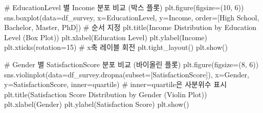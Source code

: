 \documentclass[
  letterpaper,
]{book}
\newenvironment{Shaded}{\begin{snugshade}}{\end{snugshade}}
\newcommand{\CommentTok}[1]{\textcolor[rgb]{0.37,0.37,0.37}{#1}}
\newcommand{\DecValTok}[1]{\textcolor[rgb]{0.68,0.00,0.00}{#1}}
\newcommand{\NormalTok}[1]{\textcolor[rgb]{0.00,0.23,0.31}{#1}}
\newcommand{\OperatorTok}[1]{\textcolor[rgb]{0.37,0.37,0.37}{#1}}
\newcommand{\StringTok}[1]{\textcolor[rgb]{0.13,0.47,0.30}{#1}}
\begin{document}
\begin{Shaded}
\begin{Highlighting}[]
\CommentTok{\# EducationLevel 별 Income 분포 비교 (박스 플롯)}
\NormalTok{plt.figure(figsize}\OperatorTok{=}\NormalTok{(}\DecValTok{10}\NormalTok{, }\DecValTok{6}\NormalTok{))}
\NormalTok{sns.boxplot(data}\OperatorTok{=}\NormalTok{df\_survey, x}\OperatorTok{=}\StringTok{\textquotesingle{}EducationLevel\textquotesingle{}}\NormalTok{, y}\OperatorTok{=}\StringTok{\textquotesingle{}Income\textquotesingle{}}\NormalTok{, order}\OperatorTok{=}\NormalTok{[}\StringTok{\textquotesingle{}High School\textquotesingle{}}\NormalTok{, }\StringTok{\textquotesingle{}Bachelor\textquotesingle{}}\NormalTok{, }\StringTok{\textquotesingle{}Master\textquotesingle{}}\NormalTok{, }\StringTok{\textquotesingle{}PhD\textquotesingle{}}\NormalTok{]) }\CommentTok{\# 순서 지정}
\NormalTok{plt.title(}\StringTok{\textquotesingle{}Income Distribution by Education Level (Box Plot)\textquotesingle{}}\NormalTok{)}
\NormalTok{plt.xlabel(}\StringTok{\textquotesingle{}Education Level\textquotesingle{}}\NormalTok{)}
\NormalTok{plt.ylabel(}\StringTok{\textquotesingle{}Income\textquotesingle{}}\NormalTok{)}
\NormalTok{plt.xticks(rotation}\OperatorTok{=}\DecValTok{15}\NormalTok{) }\CommentTok{\# x축 레이블 회전}
\NormalTok{plt.tight\_layout()}
\NormalTok{plt.show()}

\CommentTok{\# Gender 별 SatisfactionScore 분포 비교 (바이올린 플롯)}
\NormalTok{plt.figure(figsize}\OperatorTok{=}\NormalTok{(}\DecValTok{8}\NormalTok{, }\DecValTok{6}\NormalTok{))}
\NormalTok{sns.violinplot(data}\OperatorTok{=}\NormalTok{df\_survey.dropna(subset}\OperatorTok{=}\NormalTok{[}\StringTok{\textquotesingle{}SatisfactionScore\textquotesingle{}}\NormalTok{]), x}\OperatorTok{=}\StringTok{\textquotesingle{}Gender\textquotesingle{}}\NormalTok{, y}\OperatorTok{=}\StringTok{\textquotesingle{}SatisfactionScore\textquotesingle{}}\NormalTok{, inner}\OperatorTok{=}\StringTok{\textquotesingle{}quartile\textquotesingle{}}\NormalTok{) }\CommentTok{\# inner=\textquotesingle{}quartile\textquotesingle{}은 사분위수 표시}
\NormalTok{plt.title(}\StringTok{\textquotesingle{}Satisfaction Score Distribution by Gender (Violin Plot)\textquotesingle{}}\NormalTok{)}
\NormalTok{plt.xlabel(}\StringTok{\textquotesingle{}Gender\textquotesingle{}}\NormalTok{)}
\NormalTok{plt.ylabel(}\StringTok{\textquotesingle{}Satisfaction Score\textquotesingle{}}\NormalTok{)}
\NormalTok{plt.show()}
\end{Highlighting}
\end{Shaded}
\end{document}
